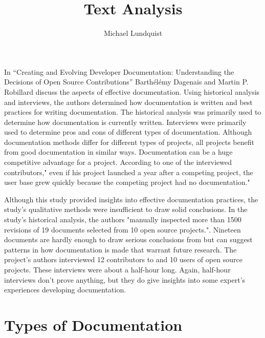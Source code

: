 \documentclass[titlepage]{article}
\author{Michael Lundquist}
\title{Text Analysis}
\begin{document}
\maketitle


\setlength{\bibleftmargin}{.125in}
\doublespacing

In “Creating and Evolving Developer Documentation: Understanding the Decisions of Open Source Contributions” Barthélémy Dagenais and Martin P. Robillard discuss the aspects of effective documentation. Using historical analysis and interviews, the authors determined how documentation is written and best practices for writing documentation. The historical analysis was primarily used to determine how documentation is currently written. Interviews were primarily used to determine pros and cons of different types of documentation. Although documentation methods differ for different types of projects, all projects benefit from good documentation in similar ways. Documentation can be a huge competitive advantage for a project. According to one of the interviewed contributors," even if his project launched a year after a competing project, the user base grew quickly because the competing project had no documentation." \cite[p.6]{Dagenais:2010:CED:1882291.1882312}

Although this study provided insights into effective documentation practices, the study's qualitative methods were insufficient to draw solid conclusions. In the study's historical analysis, the authors "manually inspected more than 1500 revisions of 19 documents selected from 10 open source projects."\cite[p.1]{Dagenais:2010:CED:1882291.1882312}. Nineteen documents are hardly enough to draw serious conclusions from but can suggest patterns in how documentation is made that warrant future research. The project's authors interviewed 12 contributors to and 10 users of open source projects. These interviews were about a half-hour long. Again, half-hour interviews don't prove anything, but they do give insights into some expert's experiences developing documentation.

\section{Types of Documentation}
\end{document}
